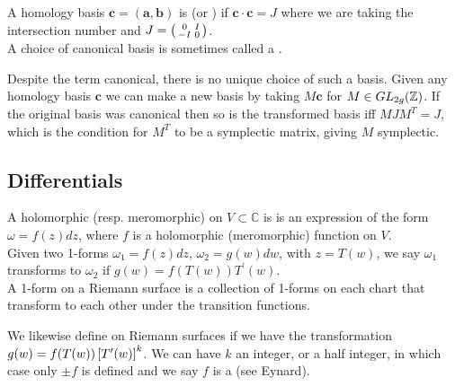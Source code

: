 \documentclass{article}
\begin{document}
\begin{definition}
	A homology basis $\bm{c} = (\bm{a},\bm{b})$ is  (or ) if $\bm{c} \cdot \bm{c} = J$ where we are taking the intersection number and $J=\begin{psmallmatrix} 0 & I \\ -I & 0 \end{psmallmatrix}$. \\
	A choice of canonical basis is sometimes called a . 
\end{definition}
\begin{remark}
	Despite the term canonical, there is no unique choice of such a basis. Given any homology basis $\bm{c}$ we can make a new basis by taking $M\bm{c}$ for $M\in GL_{2g}(\mathbb{Z})$. If the original basis was canonical then so is the transformed basis iff $MJM^T = J$, which is the condition for $M^T$ to be a symplectic matrix, giving $M$ symplectic. 
\end{remark}

\subsection{Differentials}
\begin{definition}
	A holomorphic (resp. meromorphic)  on $V \subset \mathbb{C}$ is is an expression of the form $\omega = f(z)dz$, where $f$ is a holomorphic (meromorphic) function on $V$. \\
	Given two 1-forms $\omega_1 = f(z) dz$, $\omega_2 = g(w) dw$, with $z=T(w)$, we say $\omega_1$ transforms to $\omega_2$ if $g(w) = f(T(w)) T^\prime(w)$. \\
	A 1-form on a Riemann surface is a collection of 1-forms on each chart that transform to each other under the transition functions.  
\end{definition}

\begin{definition}
	We likewise define  on Riemann surfaces if we have the transformation $g(w) = f(T(w)) \left[ T^\prime(w) \right]^k$. We can have $k$ an integer, or a half integer, in which case only $\pm f$ is defined and we say $f$ is a  (see Eynard). 
\end{definition}
\end{document}
